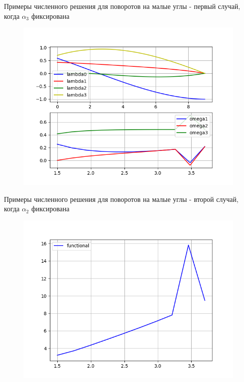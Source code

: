 \documentclass[10pt,utf8,presentation,notheorems,xcolor=dvipsnames,compress]{beamer}
\begin{document}
\begin{frame}{Примеры численного решения для поворотов на малые углы - первый случай, когда $\alpha_3$ фиксирована}
\begin{figure}[H]
\center\includegraphics[scale=0.5]{fig/ivp_and_control_1_5-3_7_50.png}
\caption{}
\end{figure}
\end{frame}

\begin{frame}{Примеры численного решения для поворотов на малые углы - второй случай, когда $\alpha_2$ фиксирована}
\begin{figure}[H]
\center\includegraphics[scale=0.5]{fig/functional_1_5-3_7_50.png}
\caption{}
\end{figure}
\end{frame}
\end{document}
